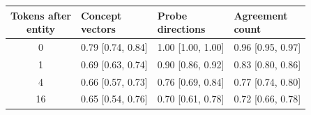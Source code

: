 \begin{tabular}{@{}clll@{}}
\toprule
\shortstack[l]{Tokens after\\entity} & \shortstack[l]{Concept\\vectors} & \shortstack[l]{Probe\\directions} & \shortstack[l]{Agreement\\count} \\
\midrule
0 & 0.79 {\scriptsize[0.74, 0.84]} & 1.00 {\scriptsize[1.00, 1.00]} & 0.96 {\scriptsize[0.95, 0.97]} \\
1 & 0.69 {\scriptsize[0.63, 0.74]} & 0.90 {\scriptsize[0.86, 0.92]} & 0.83 {\scriptsize[0.80, 0.86]} \\
4 & 0.66 {\scriptsize[0.57, 0.73]} & 0.76 {\scriptsize[0.69, 0.84]} & 0.77 {\scriptsize[0.74, 0.80]} \\
16 & 0.65 {\scriptsize[0.54, 0.76]} & 0.70 {\scriptsize[0.61, 0.78]} & 0.72 {\scriptsize[0.66, 0.78]} \\
\bottomrule
\end{tabular}

